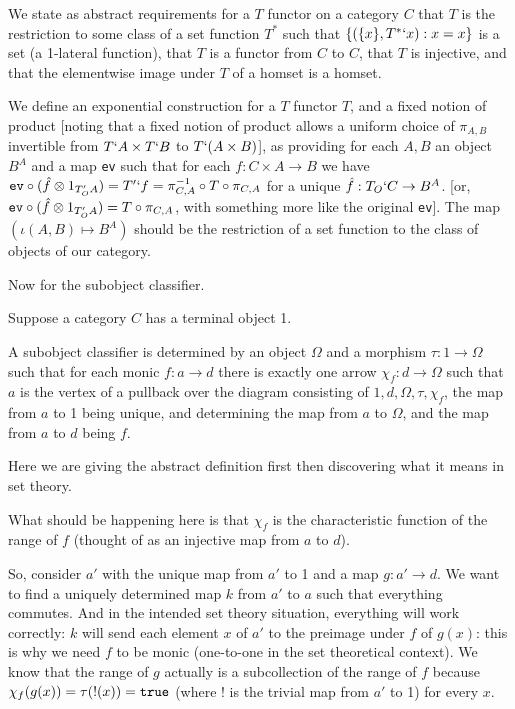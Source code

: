 \documentclass[12pt]{article}
\begin{document}
We state as abstract requirements for a $T$ functor on a category $C$ that $T$ is the restriction to some class of a set function $T^*$ such that $\{(\{x\},T^*`x):x=x\}$ is a set (a 1-lateral function), that $T$ is a functor from $C$ to $C$, that $T$ is injective, and that the elementwise image under $T$ of a homset is a homset.

We define an exponential construction for a $T$ functor $T$, and a fixed notion of product  [noting that a  fixed notion of product allows a uniform choice of $\pi_{A,B}$ invertible from $T`A \times T`B$ to $T`(A \times B)$], as providing for each $A,B$ an object $B^A$ and a map {\tt ev} such that 
 for each $f:C \times A \rightarrow B$ we have ${\tt ev}\circ (\hat f \otimes 1_{T_O'A}) = T'`f = \pi_{C,A}^{-1}\circ T \circ \pi_{C,A}$ for a unique $\hat f:T_O`C \rightarrow B^A$.  
[or,  ${\tt ev}\circ (\hat f \otimes 1_{T_O'A}) =  T \circ \pi_{C,A}$, with something more like the original {\tt ev}].
The map $(\iota(A,B) \mapsto B^A)$ should be the restriction of a set function to the class of objects of our category.


Now for the subobject classifier.

Suppose a category $C$ has a terminal object 1.

A subobject classifier is determined by an object $\Omega$ and a morphism $\tau:1 \rightarrow \Omega$ such that for each monic $f:a \rightarrow d$ there is exactly one arrow $\chi_f:d \rightarrow \Omega$
such that $a$ is the vertex of a pullback over the diagram consisting of $1,d,\Omega,\tau, \chi_f$, the map from $a$ to 1 being unique, and determining the map from $a$ to $\Omega$, and the map from $a$ to $d$ being $f$.


Here we are giving the abstract definition first then discovering what it means in set theory.

What should be happening here is that $\chi_f$ is the characteristic function of the range of $f$ (thought of as an injective map from $a$ to $d$).

So, consider $a'$ with the unique map from $a'$ to 1 and a map $g: a' \rightarrow d$.  We want to find a uniquely determined map $k$ from $a'$ to $a$ such that everything commutes.
And in the intended set theory situation, everything will work correctly:  $k$ will send each element $x$ of $a'$ to the preimage under $f$ of $g(x)$:  this is why we need
$f$ to be monic (one-to-one in the set theoretical context).  We know that the range of $g$ actually is a subcollection of the range of $f$ because
$\chi_f(g(x)) = \tau(!(x)) = {\tt true}$ (where ! is the trivial map from $a'$ to 1) for every $x$.
\end{document}
